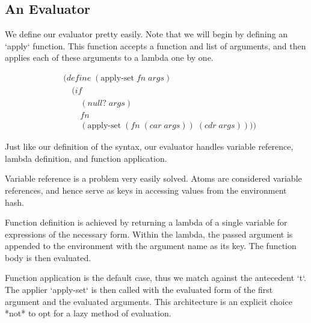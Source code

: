 \subsection{An Evaluator}
We define our evaluator pretty easily. Note that we will begin by defining an 
`apply` function. This function accepts a function and list of arguments, and 
then applies each of these arguments to a lambda one by one.

\begin{align*}
& (define \; (\text{apply-set} \; fn \; args)
\\& \quad (if
\\& \qquad (null? \; args)
\\& \qquad fn
\\& \qquad (\text{apply-set} \; (fn \; (car \; args)) \; (cdr \; args))))
\end{align*}

Just like our definition of the syntax, our evaluator handles variable reference, 
lambda definition, and function application. 

Variable reference is a problem very easily solved. Atoms are considered 
variable references, and hence serve as keys in accessing values from the 
environment hash.

Function definition is achieved by returning a lambda of a single variable for 
expressions of the necessary form. Within the lambda, the passed argument is 
appended to the environment with the argument name as its key. The function body 
is then evaluated.

Function application is the default case, thus we match against the antecedent 
`t`. The applier `apply-set` is then called with the evaluated form of the first 
argument and the evaluated arguments. This architecture is an explicit choice 
*not* to opt for a lazy method of evaluation.

